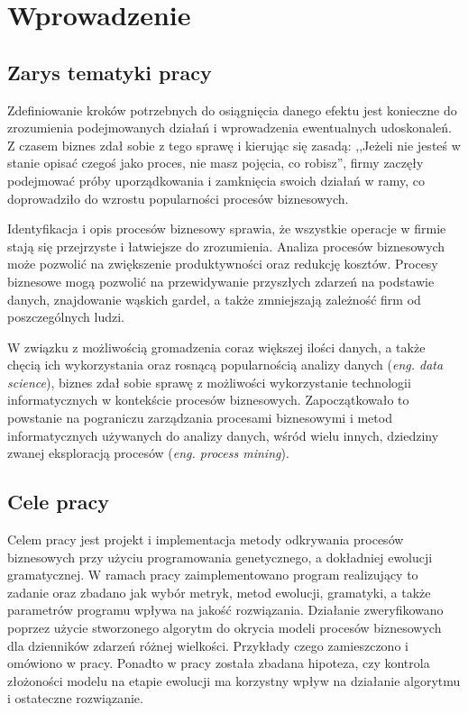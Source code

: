 \chapter{Wprowadzenie}
\label{cha:wprowadzenie}


\section{Zarys tematyki pracy}
\label{sec:zarysPracy}

Zdefiniowanie kroków potrzebnych do osiągnięcia danego efektu jest konieczne do zrozumienia podejmowanych działań i wprowadzenia ewentualnych udoskonaleń. Z czasem biznes zdał sobie z tego sprawę i kierując się zasadą: ,,Jeżeli nie jesteś w stanie opisać czegoś jako proces, nie masz pojęcia, co robisz'', firmy zaczęły podejmować próby uporządkowania i zamknięcia swoich działań w ramy, co doprowadziło do wzrostu popularności procesów biznesowych.

Identyfikacja i opis procesów biznesowy sprawia, że wszystkie operacje w firmie stają się przejrzyste i łatwiejsze do zrozumienia. Analiza procesów biznesowych może pozwolić na zwiększenie produktywności oraz redukcję kosztów. Procesy biznesowe mogą pozwolić na przewidywanie przyszłych zdarzeń na podstawie danych, znajdowanie wąskich gardeł, a także zmniejszają zależność firm od poszczególnych ludzi.

W związku z możliwością gromadzenia coraz większej ilości danych, a także chęcią ich wykorzystania oraz rosnącą popularnością analizy danych (\textit{eng. data science}), biznes zdał sobie sprawę z możliwości wykorzystanie technologii informatycznych w kontekście procesów biznesowych. Zapoczątkowało to powstanie na pograniczu zarządzania procesami biznesowymi i metod informatycznych używanych do analizy danych, wśród wielu innych, dziedziny zwanej eksploracją procesów (\textit{eng. process mining}).
 
\section{Cele pracy}
\label{sec:celePracy}

Celem pracy jest projekt i implementacja metody odkrywania procesów biznesowych przy użyciu programowania genetycznego, a dokładniej ewolucji gramatycznej. W ramach pracy zaimplementowano program realizujący to zadanie oraz zbadano jak wybór metryk, metod ewolucji, gramatyki, a także parametrów programu wpływa na jakość rozwiązania. Działanie zweryfikowano poprzez użycie stworzonego algorytm do okrycia modeli procesów biznesowych dla dzienników zdarzeń różnej wielkości. Przykłady czego zamieszczono i omówiono w pracy. Ponadto w pracy została zbadana hipoteza, czy kontrola złożoności modelu na etapie ewolucji ma korzystny wpływ na działanie algorytmu i ostateczne rozwiązanie.

